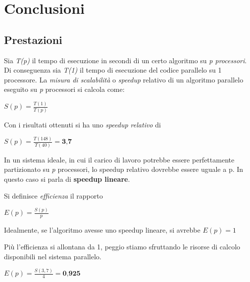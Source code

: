 \documentclass[../main.tex]{subfiles}
\begin{document}
\chapter{Conclusioni}
\section{Prestazioni}

Sia \textit{T(p)} il tempo di esecuzione in secondi di un certo algoritmo su \textit{p processori}. Di conseguenza sia \textit{T(1)} il tempo di esecuzione del codice parallelo su 1 processore.
La \textit{misura di scalabilità} o \textit{speedup} relativo di un algoritmo parallelo eseguito su \textit{p} processori si calcola come:

\begin{center}
\begin{math}
S(p) = \frac{T(1)}{T(p)}
\end{math}
\end{center}

Con i risultati ottenuti si ha uno \textit{speedup relativo} di

\begin{center}
\begin{math}
S(p) = \frac{T(148)}{T(40)} = \textbf{3,7}
\end{math}
\end{center}

In un sistema ideale, in cui il carico di lavoro potrebbe essere perfettamente partizionato su \textit{p} processori, lo speedup relativo dovrebbe essere uguale a p. In questo caso si parla di \textbf{speedup lineare}.

Si definisce \textit{efficienza} il rapporto
\begin{center}
\begin{math}
E(p) = \frac{S(p)}{p}
\end{math}
\end{center}

Idealmente, se l'algoritmo avesse uno speedup lineare, si avrebbe 
\begin{math}
E(p) = 1
\end{math}

Più l'efficienza si allontana da 1, peggio stiamo sfruttando le risorse di calcolo disponibili nel sistema parallelo.
\begin{center}
\begin{math}
				E(p) = \frac{S(3,7)}{4} = \textbf{0,925}
\end{math}
\end{center}
\end{document}
